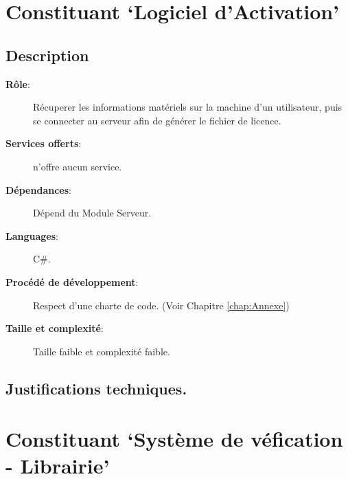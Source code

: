 \section{Constituant `Logiciel d'Activation'}
\subsection{Description}
\begin{description}
	\item[\textbf{Rôle}:]
		Récuperer les informations matériels sur la machine d'un utilisateur, puis 
		se connecter au serveur afin de générer le fichier de licence.
	\item[\textbf{Services offerts}:] 
		n'offre aucun service.
	\item[\textbf{Dépendances}:]
		Dépend du Module Serveur.
	\item[\textbf{Languages}:]
		C\#.
	\item[\textbf{Procédé de développement}:]
		Respect d'une charte de code. (Voir Chapitre \ref{chap:Annexe})
	\item[\textbf{Taille et complexité}:]
		Taille faible et complexité faible. 
\end{description}

\subsection{Justifications techniques.}

\section{Constituant `Système de véfication - Librairie'}
